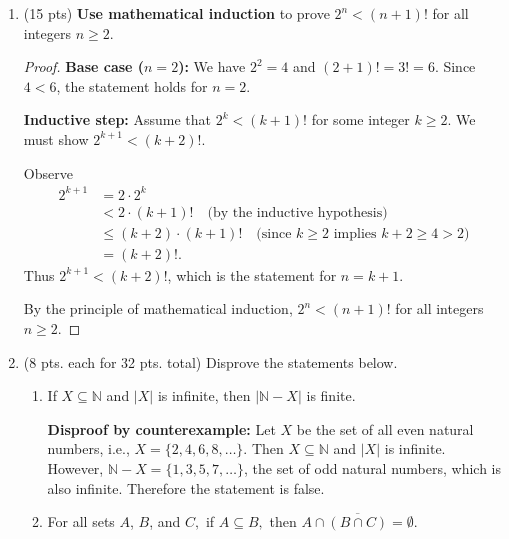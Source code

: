 \documentclass[11pt]{article}
\newcommand{\N}{{\mathbb{N}}}
\begin{document}
\begin{enumerate}
\begin{proof}
\textbf{Inductive step:} Assume that for some $k \in \N$, 
\[
  3^1 + 3^2 + \cdots + 3^k = \frac{3^{k+1}-3}{2}.
\]
We must show that
\[
  3^1 + 3^2 + \cdots + 3^k + 3^{k+1} = \frac{3^{k+2}-3}{2}.
\]
Starting from the left-hand side and applying the inductive hypothesis, we obtain
\begin{align*}
  3^1 + 3^2 + \cdots + 3^k + 3^{k+1}
  &= \frac{3^{k+1}-3}{2} + 3^{k+1} \\[6pt]
  &= \frac{3^{k+1}-3 + 2\cdot 3^{k+1}}{2} \\[6pt]
  &= \frac{3 \cdot 3^{k+1}-3}{2} \\[6pt]
  &= \frac{3^{k+2}-3}{2}.
\end{align*}
This is exactly the formula for $n = k+1$. By the principle of mathematical induction, the formula holds for all $n \in \N$. 
\end{proof}
\item (15 pts) \textbf{Use mathematical induction} to prove $2^n < (n+1)!$ for all integers $n \geq 2.$

\begin{proof}
\textbf{Base case ($n=2$):} We have $2^2 = 4$ and $(2+1)! = 3! = 6$. Since $4 < 6$, the statement holds for $n=2$.

\textbf{Inductive step:} Assume that $2^k < (k+1)!$ for some integer $k \geq 2$. We must show $2^{k+1} < (k+2)!$.

Observe
\begin{align*}
  2^{k+1} &= 2 \cdot 2^k \\
           &< 2 \cdot (k+1)! \quad \text{(by the inductive hypothesis)}\\
           &\leq (k+2)\cdot(k+1)! \quad \text{(since } k \geq 2 \text{ implies } k+2 \geq 4 > 2\text{)}\\
           &= (k+2)!.
\end{align*}
Thus $2^{k+1} < (k+2)!$, which is the statement for $n = k+1$.

By the principle of mathematical induction, $2^n < (n+1)!$ for all integers $n \geq 2$.

\end{proof}

\item (8 pts. each for 32 pts. total) Disprove the statements below.
	\begin{enumerate}
	\item If $X \subseteq \N$ and $|X|$ is infinite, then $|\N-X|$ is finite.
	
	\textbf{Disproof  by counterexample:} Let $X$ be the set of all even natural numbers, i.e., $X = \{2, 4, 6, 8, \ldots\}$. Then $X \subseteq \N$ and $|X|$ is infinite. However, $\N - X = \{1, 3, 5, 7, \ldots\}$, the set of odd natural numbers, which is also infinite. Therefore the statement is false.
	\vfill
	\item For all sets $A$, $B$, and $C,$ if $A \subseteq B,$ then $A \cap \overline{(B \cap C)}=\emptyset.$
	

\end{enumerate}
\end{enumerate}
\end{document}
